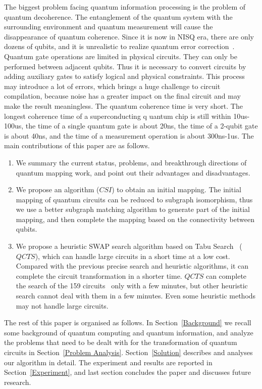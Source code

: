 \documentclass[runningheads]{llncs}
\begin{document}
The biggest problem facing quantum information processing is the problem of quantum decoherence.
The entanglement of the quantum system with the surrounding environment and quantum measurement 
will cause the disappearance of quantum coherence.
Since it is now in NISQ era, there are only dozens of qubits, 
and it is unrealistic to realize quantum error correction~\cite{2018QuantumPreskill}.
Quantum gate operations are limited in physical circuits. 
They can only be performed between adjacent qubits.
Thus it is necessary to convert circuits by adding auxiliary gates to satisfy logical and physical 
constraints. This process may introduce a lot of errors, 
which brings a huge challenge to circuit compilation, because noise has a greater impact on the 
final circuit and may make the result meaningless.
The quantum coherence time is very short. The longest coherence time of a superconducting q
uantum chip is still within 10us-100us, 
		the time of a single quantum gate is about 20ns, 
		the time of a 2-qubit gate is about 40ns, 
		and the time of a measurement operation is about 300ns-1us.
The main contributions of this paper are as follows.
	\begin{enumerate}
		\item We summary the current status, problems, and breakthrough directions 
		of quantum mapping work, and point out their advantages and disadvantages. 
		\item
		 We propose an algorithm ($CSI$) to obtain an initial mapping.
		 The initial mapping of quantum circuits can be reduced to subgraph isomorphism,
		 thus we use a better subgraph matching algorithm to generate part of the initial mapping, 
		 and then complete the mapping based on the connectivity between qubits.
		\item We propose a heuristic SWAP search algorithm based on Tabu Search~\cite{Glover1990} ($QCTS$), 
		which can handle large circuits in a short time at a low cost.
		Compared with the previous precise search and heuristic algorithms,
		it can complete the circuit transformation in a shorter time.
		$QCTS$ can complete the search of the 159 circuits~\cite{Zulehner2017} only with a few minutes, 
		but other heuristic search cannot deal with them in a few minutes.
		Even some heuristic methods may not handle large circuits.
	\end{enumerate}
	The rest of this paper is organised as follows. 
	In Section~\ref{Background} we recall some background of quantum computing and quantum information,
	and analyze the problems that need to be dealt with for the transformation of quantum circuits in Section~\ref{Problem Analysis}.
	Section~\ref{Solution} describes and analyses our algorithm in detail. 
	The experiment and results are reported in Section~\ref{Experiment}, 
	and last section concludes the paper and discusses future research.
\end{document}
